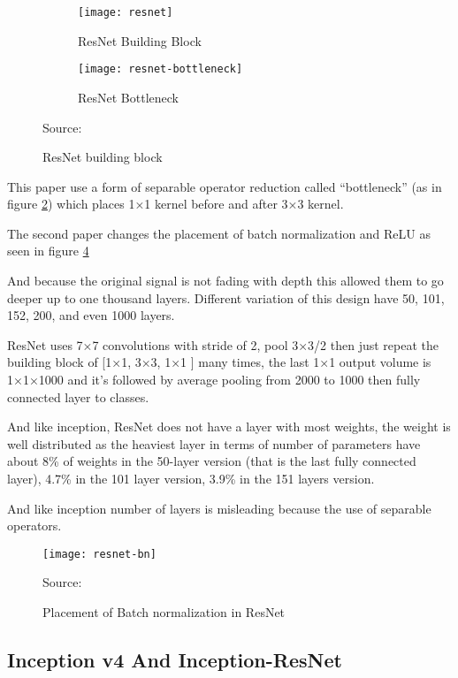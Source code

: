 \begin{figure}[!h]
\centering
    \begin{subfigure}[b]{0.4\textwidth}
        \texttt{[image: resnet]}
        \caption{ResNet Building Block}\label{fig:resnet-block}
    \end{subfigure}
    \begin{subfigure}[b]{0.4\textwidth}
        \texttt{[image: resnet-bottleneck]}
        \caption{ResNet Bottleneck}\label{fig:resnet-bottleneck}
    \end{subfigure}
\caption{ResNet building block}\label{fig:resnet}
{Source: \autocite{he2016deep}\hfill}
\end{figure}

This paper use a form of separable operator reduction called ``bottleneck'' (as in figure \ref{fig:resnet-bottleneck})
which places 1×1 kernel before and after 3×3 kernel.

The second paper\autocite{he2016identity} changes the placement of batch normalization and ReLU as seen in figure \ref{fig:resnet-bn}

And because the original signal is not fading with depth this allowed them to go deeper up to one thousand layers.
Different variation of this design have 50, 101, 152, 200, and even 1000 layers.

ResNet uses 7×7 convolutions with stride of 2, pool 3×3/2 then just repeat the building block of [1×1, 3×3, 1×1 ] many times,
the last 1×1 output volume is 1×1×1000 and it’s followed by average pooling from 2000 to 1000
then fully connected layer to classes.

And like inception, ResNet does not have a layer with most weights,
the weight is well distributed as the heaviest layer in terms of number of parameters
have about 8\% of weights in the 50-layer version (that is the last fully connected layer),
4.7\% in the 101 layer version, 3.9\% in the 151 layers version.

And like inception number of layers is misleading because the use of separable operators.

\begin{figure}[!h]
\centering
\texttt{[image: resnet-bn]}
\caption{Placement of Batch normalization in ResNet}\label{fig:resnet-bn}
{Source: \autocite{he2016identity}\hfill}
\end{figure}


\subsection{Inception v4 And Inception-ResNet}

